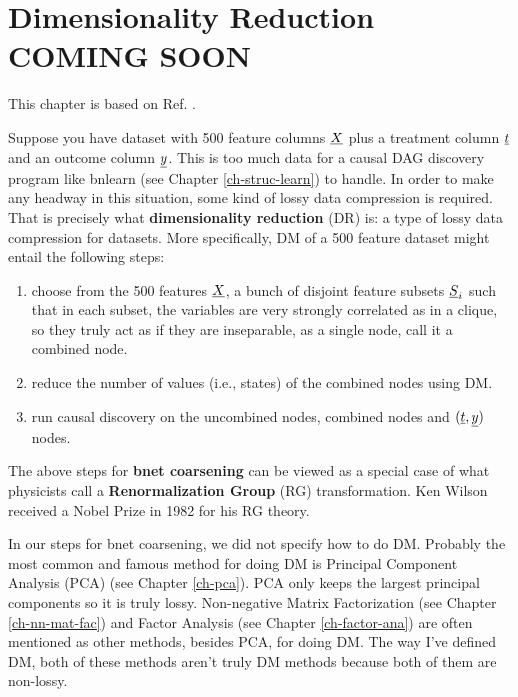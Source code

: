 \chapter{Dimensionality Reduction COMING SOON}
\label{ch-dim-reduc}


This chapter is based on Ref. \cite{wiki-dim-reduc}.


Suppose you have dataset with 500 feature columns ${\underline{X}}$ plus a treatment
column ${\underline{t}}$ and an outcome column ${\underline{y}}$.
This is too much data
for a causal DAG discovery program 
like bnlearn (see Chapter \ref{ch-struc-learn}) to handle.
In order to make any headway in this situation,
some kind of lossy data compression is required. That is precisely what {\bf dimensionality reduction} (DR) is: a type
of lossy data compression for datasets.
More specifically, DM of a 500 feature dataset might entail the 
following steps:
\begin{enumerate}

\item choose from the 500 features ${\underline{X}}$, a bunch of disjoint feature subsets ${\underline{S}}_i$ such that in each subset, the variables are very strongly correlated as in a clique, so they truly act as if they are inseparable, as a single node, call it a combined node.

\item reduce the number of values (i.e., states) of the combined nodes using DM.

\item run causal discovery on the uncombined nodes, combined nodes and $({\underline{t}}, {\underline{y}})$
 nodes.
\end{enumerate}

The above steps for {\bf bnet  coarsening} can be
viewed as a special case of what physicists call a {\bf Renormalization Group} (RG) transformation. Ken Wilson received a Nobel Prize in 1982 for his RG theory.

In our steps for bnet coarsening,
we did not specify how to do DM. 
Probably the most common
and famous method for doing DM is
Principal Component Analysis (PCA)
(see Chapter \ref{ch-pca}). PCA 
only keeps the largest principal 
components so it is truly lossy. Non-negative Matrix Factorization 
(see Chapter \ref{ch-nn-mat-fac})
and Factor Analysis (see Chapter \ref{ch-factor-ana})
are often mentioned as other
methods, besides PCA, for doing DM. The way I've
defined DM, both of these methods aren't truly DM methods because both of them are non-lossy.
